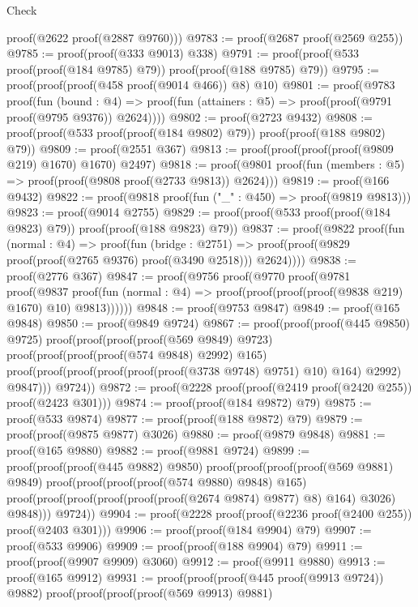 \begin{lexlean}{Check}
\begin{coremodule}
      proof(@2622 proof(@2887 @9760)))
@9783 := proof(@2687 proof(@2569 @255))
@9785 := proof(proof(@333 @9013) @338)
@9791 := proof(proof(@533 proof(proof(@184 @9785) @79)) proof(proof(@188 @9785) @79))
@9795 := proof(proof(proof(@458 proof(@9014 @466)) @8) @10)
@9801 := proof(@9783
      proof(fun (bound : @4) =>
        proof(fun (attainers : @5) => proof(proof(@9791 proof(@9795 @9376)) @2624))))
@9802 := proof(@2723 @9432)
@9808 := proof(proof(@533 proof(proof(@184 @9802) @79)) proof(proof(@188 @9802) @79))
@9809 := proof(@2551 @367)
@9813 := proof(proof(proof(proof(@9809 @219) @1670) @1670) @2497)
@9818 := proof(@9801 proof(fun (members : @5) => proof(proof(@9808 proof(@2733 @9813)) @2624)))
@9819 := proof(@166 @9432)
@9822 := proof(@9818 proof(fun ("_" : @450) => proof(@9819 @9813)))
@9823 := proof(@9014 @2755)
@9829 := proof(proof(@533 proof(proof(@184 @9823) @79)) proof(proof(@188 @9823) @79))
@9837 := proof(@9822
      proof(fun (normal : @4) =>
        proof(fun (bridge : @2751) =>
          proof(proof(@9829 proof(proof(@2765 @9376) proof(@3490 @2518))) @2624))))
@9838 := proof(@2776 @367)
@9847 := proof(@9756
      proof(@9770
          proof(@9781
              proof(@9837
                  proof(fun (normal : @4) =>
                    proof(proof(proof(proof(@9838 @219) @1670) @10) @9813))))))
@9848 := proof(@9753 @9847)
@9849 := proof(@165 @9848)
@9850 := proof(@9849 @9724)
@9867 := proof(proof(proof(@445 @9850) @9725)
      proof(proof(proof(proof(@569 @9849) @9723)
            proof(proof(proof(proof(@574 @9848) @2992) @165)
                proof(proof(proof(proof(proof(proof(@3738 @9748) @9751) @10) @164) @2992) @9847)))
          @9724))
@9872 := proof(@2228 proof(proof(@2419 proof(@2420 @255)) proof(@2423 @301)))
@9874 := proof(proof(@184 @9872) @79)
@9875 := proof(@533 @9874)
@9877 := proof(proof(@188 @9872) @79)
@9879 := proof(proof(@9875 @9877) @3026)
@9880 := proof(@9879 @9848)
@9881 := proof(@165 @9880)
@9882 := proof(@9881 @9724)
@9899 := proof(proof(proof(@445 @9882) @9850)
      proof(proof(proof(proof(@569 @9881) @9849)
            proof(proof(proof(proof(@574 @9880) @9848) @165)
                proof(proof(proof(proof(proof(proof(@2674 @9874) @9877) @8) @164) @3026) @9848)))
          @9724))
@9904 := proof(@2228 proof(proof(@2236 proof(@2400 @255)) proof(@2403 @301)))
@9906 := proof(proof(@184 @9904) @79)
@9907 := proof(@533 @9906)
@9909 := proof(proof(@188 @9904) @79)
@9911 := proof(proof(@9907 @9909) @3060)
@9912 := proof(@9911 @9880)
@9913 := proof(@165 @9912)
@9931 := proof(proof(proof(@445 proof(@9913 @9724)) @9882)
      proof(proof(proof(proof(@569 @9913) @9881)

\end{coremodule}
\end{lexlean}
